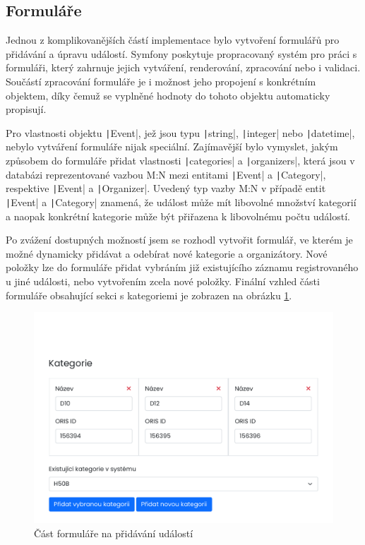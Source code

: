 \subsection{Formuláře}
Jednou z komplikovanějších částí implementace bylo vytvoření formulářů pro přidávání a úpravu událostí. Symfony poskytuje propracovaný systém pro práci s formuláři, který zahrnuje jejich vytváření, renderování, zpracování nebo i validaci. Součástí zpracování formuláře je i možnost jeho propojení s konkrétním objektem, díky čemuž se vyplněné hodnoty do tohoto objektu automaticky propisují.

Pro vlastnosti objektu \texttt|Event|, jež jsou typu \texttt|string|, \texttt|integer| nebo \texttt|datetime|, nebylo vytváření formuláře nijak speciální. Zajímavější bylo vymyslet, jakým způsobem do formuláře přidat vlastnosti \texttt|categories| a \texttt|organizers|, která jsou v databázi reprezentované vazbou M:N mezi entitami \texttt|Event| a \texttt|Category|, respektive \texttt|Event| a \texttt|Organizer|. Uvedený typ vazby M:N v případě entit \texttt|Event| a \texttt|Category| znamená, že událost může mít libovolné množství kategorií a naopak konkrétní kategorie může být přiřazena k libovolnému počtu událostí.

Po zvážení dostupných možností jsem se rozhodl vytvořit formulář, ve kterém je možné dynamicky přidávat a odebírat nové kategorie a organizátory. Nové položky lze do formuláře přidat vybráním již existujícího záznamu registrovaného u jiné události, nebo vytvořením zcela nové položky. Finální vzhled části formuláře obsahující sekci s kategoriemi je zobrazen na obrázku \ref{figure:form}.

\begin{figure}[h]
    \caption{Část formuláře na přidávání událostí}
    \label{figure:form}
    \centering
    \includegraphics[width=0.95\linewidth]{images/form.pdf}
\end{figure}

